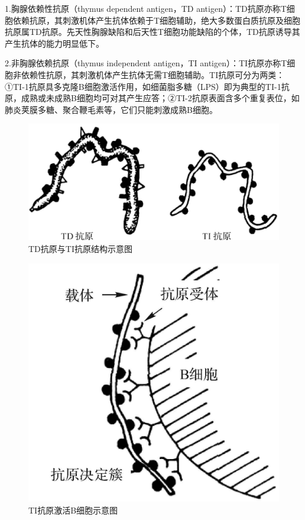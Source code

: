1.胸腺依赖性抗原（thymus dependent antigen，TD
antigen）：TD抗原亦称T细胞依赖抗原，其刺激机体产生抗体依赖于T细胞辅助，绝大多数蛋白质抗原及细胞抗原属TD抗原。先天性胸腺缺陷和后天性T细胞功能缺陷的个体，TD抗原诱导其产生抗体的能力明显低下。

2.非胸腺依赖抗原（thymus independent antigen，TI
antigen）：TI抗原亦称T细胞非依赖性抗原，其刺激机体产生抗体无需T细胞辅助。TI抗原可分为两类：①TI-1抗原具多克隆B细胞激活作用，如细菌脂多糖（LPS）即为典型的TI-1抗原，成熟或未成熟B细胞均可对其产生应答；②TI-2抗原表面含多个重复表位，如肺炎荚膜多糖、聚合鞭毛素等，它们只能刺激成熟B细胞。

\begin{figure}[!htbp]
 \centering
 \includegraphics{./images/Image00055.jpg}
 \captionsetup{justification=centering}
 \caption{TD抗原与TI抗原结构示意图}
 \label{fig3-6}
  \end{figure}

\begin{figure}[!htbp]
 \centering
 \includegraphics{./images/Image00056.jpg}
 \captionsetup{justification=centering}
 \caption{TI抗原激活B细胞示意图}
 \label{fig3-7}
  \end{figure}


